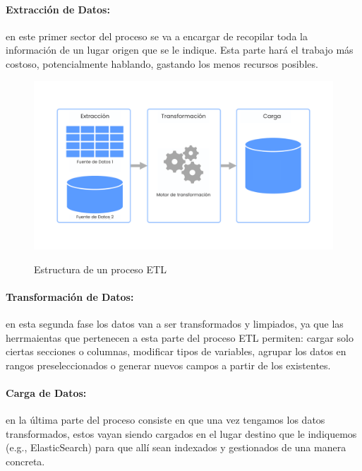 \paragraph{Extracción de Datos:}en este primer sector del proceso se va a encargar de recopilar toda la información de un lugar origen que se le indique. Esta parte hará el trabajo más costoso, potencialmente hablando, gastando los menos recursos posibles.


\begin{figure}
    \centering
    \includegraphics[width=1\linewidth]{img/etl.png}
    \caption{Estructura de un proceso ETL}
    \label{fig:ProcesoETL}\cite{ProcesoETL} 
\end{figure}

\paragraph{Transformación de Datos:}
en esta segunda fase los datos van a ser transformados y limpiados, ya que las herrmaientas que pertenecen a esta parte del proceso ETL permiten: cargar solo ciertas secciones o columnas, modificar tipos de variables, agrupar los datos en rangos preseleccionados o generar nuevos campos a partir de los existentes.

\paragraph{Carga de Datos:}
en la última parte del proceso consiste en que una vez tengamos los datos transformados, estos vayan siendo cargados en el lugar destino que le indiquemos (e.g., ElasticSearch) para que allí sean indexados y gestionados de una manera concreta.
